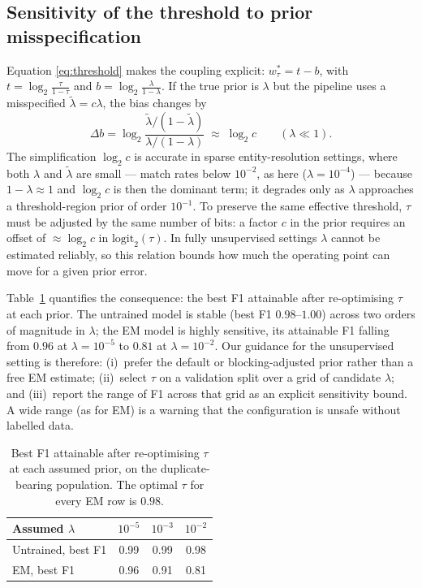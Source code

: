 \documentclass[conference]{IEEEtran}
\begin{document}
\subsection{Sensitivity of the threshold to prior misspecification}
\label{sec:sensitivity}
Equation \eqref{eq:threshold} makes the coupling explicit:
$w_\tau^*=t-b$, with $t=\log_2\frac{\tau}{1-\tau}$ and $b=\log_2\frac{\lambda}{1-\lambda}$.
If the true prior is $\lambda$ but the pipeline uses a misspecified $\tilde\lambda=c\lambda$,
the bias changes by
\begin{equation}
\Delta b=\log_2\frac{\tilde\lambda/(1-\tilde\lambda)}{\lambda/(1-\lambda)}
\;\approx\;\log_2 c\qquad(\lambda\ll 1).
\end{equation}
The simplification $\log_2 c$ is accurate in sparse entity-resolution settings, where both
$\lambda$ and $\tilde\lambda$ are small --- match rates below $10^{-2}$, as here
($\lambda=10^{-4}$) --- because $1-\lambda\approx1$ and $\log_2 c$ is then the dominant term;
it degrades only as $\lambda$ approaches a threshold-region prior of order $10^{-1}$.
To preserve the same effective threshold, $\tau$ must be adjusted by the same number of
bits: a factor $c$ in the prior requires an offset of $\approx\log_2 c$ in
$\mathrm{logit}_2(\tau)$. In fully unsupervised settings $\lambda$ cannot be estimated
reliably, so this relation bounds how much the operating point can move for a given prior
error.

Table~\ref{tab:sens} quantifies the consequence: the best F1 attainable after re-optimising
$\tau$ at each prior. The untrained model is stable (best F1 $0.98$--$1.00$) across two
orders of magnitude in $\lambda$; the EM model is highly sensitive, its attainable F1
falling from $0.96$ at $\lambda=10^{-5}$ to $0.81$ at $\lambda=10^{-2}$. Our guidance for the
unsupervised setting is therefore: (i)~prefer the default or blocking-adjusted prior rather
than a free EM estimate; (ii)~select $\tau$ on a validation split over a grid of candidate
$\lambda$; and (iii)~report the range of F1 across that grid as an explicit sensitivity
bound. A wide range (as for EM) is a warning that the configuration is unsafe without
labelled data.

\begin{table}[h]
\centering
\caption{Best F1 attainable after re-optimising $\tau$ at each assumed prior, on the
duplicate-bearing population. The optimal $\tau$ for every EM row is $0.98$.}
\label{tab:sens}
\begin{tabular}{lccc}
\toprule
Assumed $\lambda$ & $10^{-5}$ & $10^{-3}$ & $10^{-2}$ \\
\midrule
Untrained, best F1 & 0.99 & 0.99 & 0.98 \\
EM, best F1 & 0.96 & 0.91 & 0.81 \\
\bottomrule
\end{tabular}
\end{table}
\end{document}
